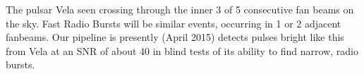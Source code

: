 The pulsar Vela seen crossing through the inner 3 of 5 consecutive fan beams on the sky. Fast Radio Bursts will be similar events, occurring in 1 or 2 adjacent fanbeams. Our pipeline is presently (April 2015) detects pulses bright like this from Vela at an SNR of about 40 in blind tests of its ability to find narrow, radio bursts.  